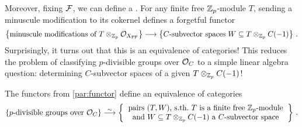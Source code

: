 \documentclass[a4paper, 10pt, oneside, DIV=9, chapterprefix=true, numbers=enddot,bibliography=totoc]{scrbook}
\begin{document}
	Moreover, fixing $\mathcal{F}$, we can define a . For any finite free $\mathbb{Z}_p$-module $T$, sending a minuscule modification to its cokernel defines a forgetful functor
	\begin{equation*}
	\left\{\text{minuscule modifications of }T\otimes_{\IZ_p}\Oo_{X_\FFC}\right\}\morphism \left\{\text{$C$-subvector spaces }W\subseteq T\otimes_{\IZ_p}C(-1)\right\}\,.
	\end{equation*}
	Surprisingly, it turns out that this is an equivalence of categories! This reduces the problem of classifying $p$-divisible groups over $\mathcal{O}_C$ to a simple linear algebra question: determining $C$-subvector spaces of a given $T\otimes_{\mathbb{Z}_p}C(-1)$!
\begin{thm}\label{thm:ScholzeWeinstein}
	The functors from \cref{par:functor} define an equivalence of categories
	\begin{equation*}
		\left\{\text{$p$-divisible groups over $\Oo_C$}\right\}\isomorphism\left\{\begin{tabular}{c}
		pairs $(T,W)$, s.th.\ $T$ is a finite free $\IZ_p$-module\\
		and $W\subseteq T\otimes_{\IZ_p}C(-1)$ a $C$-subvector space
		\end{tabular}\right\}\,.
	\end{equation*}
\end{thm}
	
\end{document}

